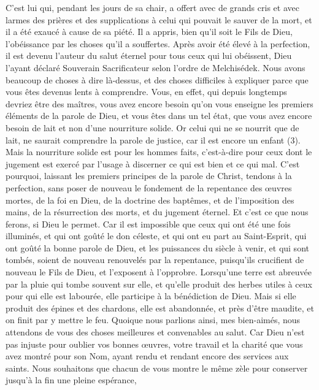 \begin{multicols}{2}
C’est lui qui, pendant les jours de sa chair, a offert avec de grands cris et avec larmes des prières et des supplications à celui qui pouvait le sauver de la mort, et il a été exaucé à cause de sa piété.
Il a appris, bien qu’il soit le Fils de Dieu, l'obéissance par les choses qu'il a souffertes.
Après avoir été élevé à la perfection, il est devenu l'auteur du salut éternel pour tous ceux qui lui obéissent,
Dieu l’ayant déclaré Souverain Sacrificateur selon l'ordre de Melchisédek.
Nous avons beaucoup de choses à dire là-dessus, et des choses difficiles à expliquer parce que vous êtes devenus lents à comprendre.
Vous, en effet, qui depuis longtemps devriez être des maîtres, vous avez encore besoin qu'on vous enseigne les premiers éléments de la parole de Dieu, et vous êtes dans un tel état, que vous avez encore besoin de lait et non d’une nourriture solide.
Or celui qui ne se nourrit que de lait, ne saurait comprendre la parole de justice, car il est encore un enfant (3).
Mais la nourriture solide est pour les hommes faits, c'est-à-dire pour ceux dont le jugement est exercé par l’usage à discerner ce qui est bien et ce qui mal.
\VerseOne{}C'est pourquoi, laissant les premiers principes de la parole de Christ, tendons à la perfection, sans poser de nouveau le fondement de la repentance des œuvres mortes,
de la foi en Dieu, de la doctrine des baptêmes, et de l'imposition des mains, de la résurrection des morts, et du jugement éternel.
Et c'est ce que nous ferons, si Dieu le permet.
Car il est impossible que ceux qui ont été une fois illuminés, et qui ont goûté le don céleste, et qui ont eu part au Saint-Esprit,
qui ont goûté la bonne parole de Dieu, et les puissances du siècle à venir,
et qui sont tombés, soient de nouveau renouvelés par la repentance, puisqu’ils crucifient de nouveau le Fils de Dieu, et l'exposent à l'opprobre.
Lorsqu’une terre est abreuvée par la pluie qui tombe souvent sur elle, et qu’elle produit des herbes utiles à ceux pour qui elle est labourée, elle participe à la bénédiction de Dieu.
Mais si elle produit des épines et des chardons, elle est abandonnée, et près d’être maudite, et on finit par y mettre le feu.
Quoique nous parlions ainsi, mes bien-aimés, nous attendons de vous des choses meilleures et convenables au salut.
Car Dieu n'est pas injuste pour oublier vos bonnes œuvres, votre travail et la charité que vous avez montré pour son Nom, ayant rendu et rendant encore des services aux saints.
Nous souhaitons que chacun de vous montre le même zèle pour conserver jusqu'à la fin une pleine espérance,

\end{multicols}
